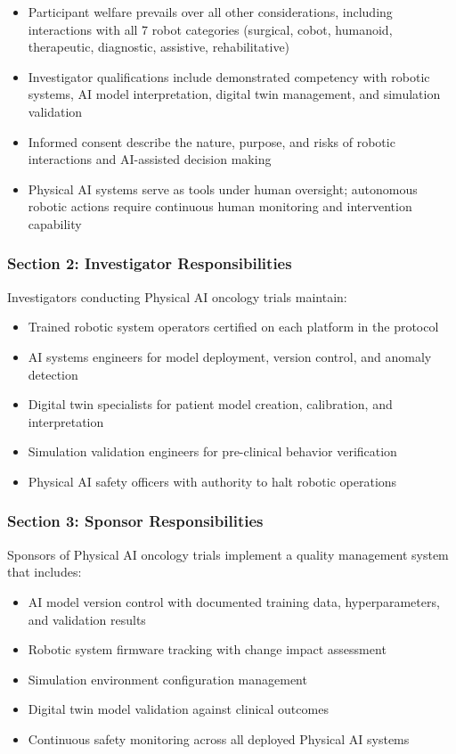 \documentclass[11pt,letterpaper]{article}
\begin{document}
\begin{itemize}
  \item Participant welfare prevails over all other considerations, including interactions with all 7 robot categories (surgical, cobot, humanoid, therapeutic, diagnostic, assistive, rehabilitative)
  \item Investigator qualifications \SHALL{} include demonstrated competency with robotic systems, AI model interpretation, digital twin management, and simulation validation
  \item Informed consent \SHALL{} describe the nature, purpose, and risks of robotic interactions and AI-assisted decision making
  \item Physical AI systems serve as tools under human oversight; autonomous robotic actions require continuous human monitoring and intervention capability
\end{itemize}

\subsubsection{Section 2: Investigator Responsibilities}

Investigators conducting Physical AI oncology trials \SHALL{} maintain:

\begin{itemize}
  \item Trained robotic system operators certified on each platform in the protocol
  \item AI systems engineers for model deployment, version control, and anomaly detection
  \item Digital twin specialists for patient model creation, calibration, and interpretation
  \item Simulation validation engineers for pre-clinical behavior verification
  \item Physical AI safety officers with authority to halt robotic operations
\end{itemize}

\subsubsection{Section 3: Sponsor Responsibilities}

Sponsors of Physical AI oncology trials \SHALL{} implement a quality management system that includes:

\begin{itemize}
  \item AI model version control with documented training data, hyperparameters, and validation results
  \item Robotic system firmware tracking with change impact assessment
  \item Simulation environment configuration management
  \item Digital twin model validation against clinical outcomes
  \item Continuous safety monitoring across all deployed Physical AI systems
\end{itemize}
\end{document}
